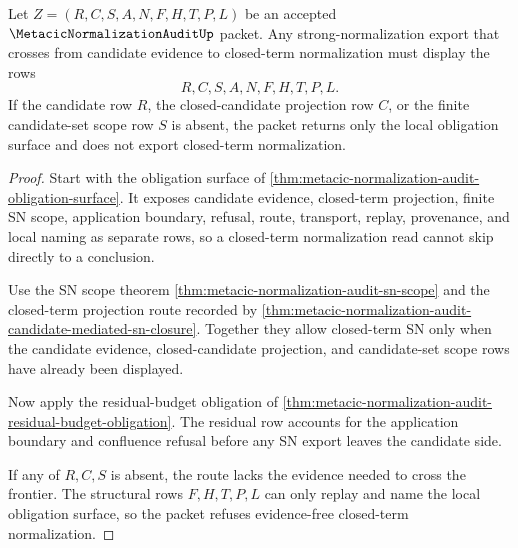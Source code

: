 \begin{theorem}
\label{thm:metacic-normalization-audit-candidate-frontier-refusal}
Let $Z=(R,C,S,A,N,F,H,T,P,L)$ be an accepted $\MetacicNormalizationAuditUp$ packet. Any strong-normalization export that crosses from candidate evidence to closed-term normalization must display the rows
$$
R,C,S,A,N,F,H,T,P,L.
$$
If the candidate row $R$, the closed-candidate projection row $C$, or the finite candidate-set scope row $S$ is absent, the packet returns only the local obligation surface and does not export closed-term normalization.
\end{theorem}
\begin{proof}
Start with the obligation surface of \autoref{thm:metacic-normalization-audit-obligation-surface}. It exposes candidate evidence, closed-term projection, finite SN scope, application boundary, refusal, route, transport, replay, provenance, and local naming as separate rows, so a closed-term normalization read cannot skip directly to a conclusion.

Use the SN scope theorem \autoref{thm:metacic-normalization-audit-sn-scope} and the closed-term projection route recorded by \autoref{thm:metacic-normalization-audit-candidate-mediated-sn-closure}. Together they allow closed-term SN only when the candidate evidence, closed-candidate projection, and candidate-set scope rows have already been displayed.

Now apply the residual-budget obligation of \autoref{thm:metacic-normalization-audit-residual-budget-obligation}. The residual row accounts for the application boundary and confluence refusal before any SN export leaves the candidate side.

If any of $R,C,S$ is absent, the route lacks the evidence needed to cross the frontier. The structural rows $F,H,T,P,L$ can only replay and name the local obligation surface, so the packet refuses evidence-free closed-term normalization.
\end{proof}

